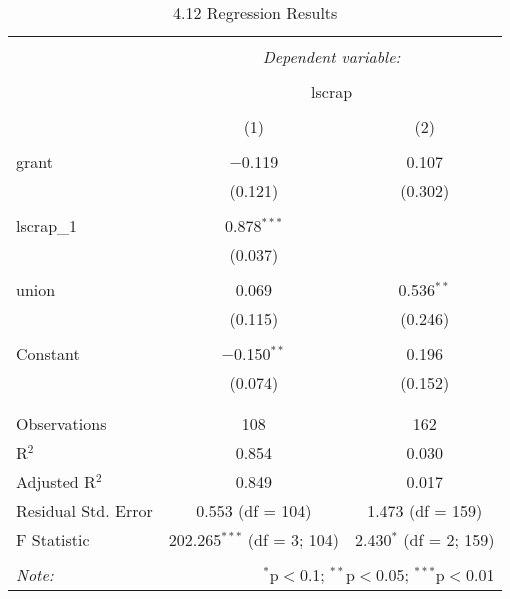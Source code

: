 \documentclass[11pt]{article} %
\begin{document}
  \begin{table}[!htbp] \centering 
    \caption{4.12 Regression Results} 
    \label{table:4.12} 
  \begin{tabular}{@{\extracolsep{5pt}}lcc} 
  \\[-1.8ex]\hline 
  \hline \\[-1.8ex] 
   & \multicolumn{2}{c}{\textit{Dependent variable:}} \\ 
  \cline{2-3} 
  \\[-1.8ex] & \multicolumn{2}{c}{lscrap} \\ 
  \\[-1.8ex] & (1) & (2)\\ 
  \hline \\[-1.8ex] 
   grant & $-$0.119 & 0.107 \\ 
    & (0.121) & (0.302) \\ 
    & & \\ 
   lscrap\_1 & 0.878$^{***}$ &  \\ 
    & (0.037) &  \\ 
    & & \\ 
   union & 0.069 & 0.536$^{**}$ \\ 
    & (0.115) & (0.246) \\ 
    & & \\ 
   Constant & $-$0.150$^{**}$ & 0.196 \\ 
    & (0.074) & (0.152) \\ 
    & & \\ 
  \hline \\[-1.8ex] 
  Observations & 108 & 162 \\ 
  R$^{2}$ & 0.854 & 0.030 \\ 
  Adjusted R$^{2}$ & 0.849 & 0.017 \\ 
  Residual Std. Error & 0.553 (df = 104) & 1.473 (df = 159) \\ 
  F Statistic & 202.265$^{***}$ (df = 3; 104) & 2.430$^{*}$ (df = 2; 159) \\ 
  \hline 
  \hline \\[-1.8ex] 
  \textit{Note:}  & \multicolumn{2}{r}{$^{*}$p$<$0.1; $^{**}$p$<$0.05; $^{***}$p$<$0.01} \\ 
  \end{tabular} 
  \end{table} 
\end{document}

